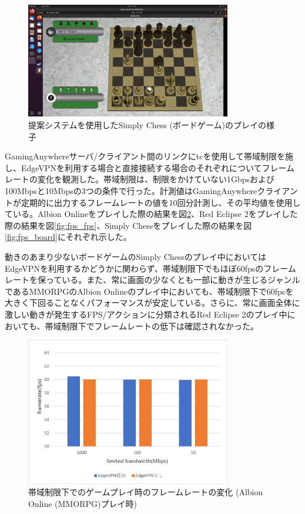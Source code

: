 \begin{figure}[t]
    \centering
    \includegraphics[width=0.8\textwidth,keepaspectratio,clip]{img/screen_board.pdf}
    \caption{提案システムを使用したSimply Chess (ボードゲーム)のプレイの様子}
    \label{fig:screen_board}
\end{figure}

GamingAnywhereサーバ/クライアント間のリンクにtcを使用して帯域制限を施し、EdgeVPNを利用する場合と直接接続する場合のそれぞれについてフレームレートの変化を観測した。帯域制限は、制限をかけていない1Gbpsおよび100Mbpsと10Mbpsの3つの条件で行った。計測値はGamingAnywhereクライアントが定期的に出力するフレームレートの値を10回分計測し、その平均値を使用している。Albion Onlineをプレイした際の結果を図\ref{fig:fps_mmo}、Red Eclipse 2をプレイした際の結果を図\ref{fig:fps_fps}、Simply Chessをプレイした際の結果を図\ref{fig:fps_board}にそれぞれ示した。

動きのあまり少ないボードゲームのSimply Chessのプレイ中においてはEdgeVPNを利用するかどうかに関わらず、帯域制限下でもほぼ60fpsのフレームレートを保っている。また、常に画面の少なくとも一部に動きが生じるジャンルであるMMORPGのAlbion Onlineのプレイ中においても、帯域制限下で60fpsを大きく下回ることなくパフォーマンスが安定している。さらに、常に画面全体に激しい動きが発生するFPS/アクションに分類されるRed Eclipse 2のプレイ中においても、帯域制限下でフレームレートの低下は確認されなかった。

\begin{figure}[t]
    \centering
    \includegraphics[width=0.8\textwidth,keepaspectratio,clip]{img/framerate_MMO.pdf}
    \caption{帯域制限下でのゲームプレイ時のフレームレートの変化 (Albion Online (MMORPG)プレイ時)}
    \label{fig:fps_mmo}
\end{figure}

